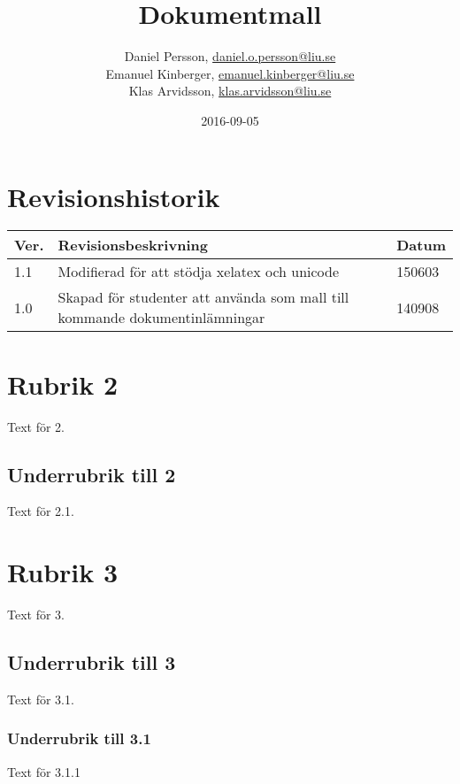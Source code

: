 \documentclass{TDP003mall}
\author{Daniel Persson, \url{daniel.o.persson@liu.se}\\
  Emanuel Kinberger, \url{emanuel.kinberger@liu.se}\\
  Klas Arvidsson, \url{klas.arvidsson@liu.se}}
\title{Dokumentmall}
\date{2016-09-05}
\begin{document}
\projectpage
\section{Revisionshistorik}
\begin{table}[!h]
\begin{tabularx}{\linewidth}{|l|X|l|}
\hline
Ver. & Revisionsbeskrivning & Datum \\\hline
1.1 & Modifierad för att stödja xelatex och unicode & 150603 \\\hline
1.0 & Skapad för studenter att använda som mall till
kommande dokumentinlämningar & 140908 \\\hline
\end{tabularx}
\end{table}


\section{Rubrik 2}
Text för 2.

\subsection{Underrubrik till 2}
Text för 2.1.

\section{Rubrik 3}
Text för 3.

\subsection{Underrubrik till 3}
Text för 3.1.

\subsubsection{Underrubrik till 3.1}
Text för 3.1.1
\end{document}
